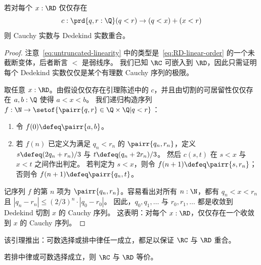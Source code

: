 \begin{lem} \label{lem:untruncated-linearity-reals-coincide}
  若对每个 $x : \RD$ 仅仅存在
  \begin{equation}
    \label{eq:untruncated-linearity}
    c : \prd{q, r : \Q} (q < r) \to (q < x) + (x < r)
  \end{equation}
  则 Cauchy 实数与 Dedekind 实数重合。
\end{lem}

\begin{proof}
  注意~\eqref{eq:untruncated-linearity} 中的类型是~\eqref{eq:RD-linear-order} 的一个未截断变体，后者断言 $<$ 是弱线序。
  我们已知 $\RC$ 可嵌入到 $\RD$，因此只需证明每个 Dedekind 实数仅仅是某个有理数 Cauchy 序列的极限。

  取任意 $x : \RD$。由假设仅仅存在引理陈述中的 $c$，并且由切割的可居留性仅仅存在 $a, b : \Q$ 使得 $a < x < b$。
  我们递归构造序列
  $f : \N \to \setof{ \pairr{q, r} \in \Q \times \Q | q < r }$：
  \begin{enumerate}
  \item 令 $f(0) \defeq \pairr{a, b}$。
  \item 若 $f(n)$ 已定义为满足 $q_n < r_n$ 的 $\pairr{q_n, r_n}$，定义
    $s \defeq (2 q_n + r_n)/3$ 与 $t \defeq (q_n + 2 r_n)/3$。
    然后 $c(s,t)$ 在 $s < x$ 与 $x < t$ 之间作出判定。
    若判定为 $s < x$，则令 $f(n+1) \defeq \pairr{s, r_n}$；否则令 $f(n+1) \defeq \pairr{q_n, t}$。
  \end{enumerate}
  记序列 $f$ 的第 $n$ 项为 $\pairr{q_n, r_n}$。容易看出对所有 $n : \N$，都有
  $q_n < x < r_n$ 且 $|q_n - r_n| \leq (2/3)^n \cdot |q_0 - r_0|$。
  因此，$q_0, q_1, \ldots$ 与 $r_0, r_1, \ldots$ 都是收敛到 Dedekind 切割 $x$ 的 Cauchy 序列。
  这表明：对每个 $x : \RD$，仅仅存在一个收敛到 $x$ 的 Cauchy 序列。
\end{proof}

该引理推出：可数选择或排中律任一成立，都足以保证 $\RC$ 与 $\RD$ 重合。

\begin{cor} \label{when-reals-coincide}
  若排中律或可数选择成立，则 $\RC$ 与 $\RD$ 等价。
\end{cor}

